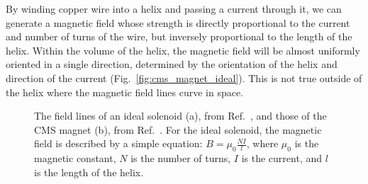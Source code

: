 By winding copper wire into a helix and passing a current through it, we can generate a magnetic field whose strength is directly proportional to the current and number of turns of the wire, but inversely proportional to the length of the helix. 
Within the volume of the helix, the magnetic field will be almost uniformly oriented in a single direction, determined by the orientation of the helix and direction of the current (Fig.~\ref{fig:cms_magnet_ideal}). 
This is not true outside of the helix where the magnetic field lines curve in space. 

\begin{figure}[htb]
    \centering
    \quad
    \caption[The field lines of an ideal solenoid and those of the CMS magnet.]{
        The field lines of an ideal solenoid (a), from Ref.~\cite{SolenoidFieldLines}, and those of the CMS magnet (b), from Ref.~\cite{CMS:2009moq}. 
        For the ideal solenoid, the magnetic field is described by a simple equation: $B = \mu_0\frac{NI}{l}$, where $\mu_0$ is the magnetic constant, $N$ is the number of turns, $I$ is the current, and $l$ is the length of the helix. 
    }
    \label{fig:cms_fields}
\end{figure}

